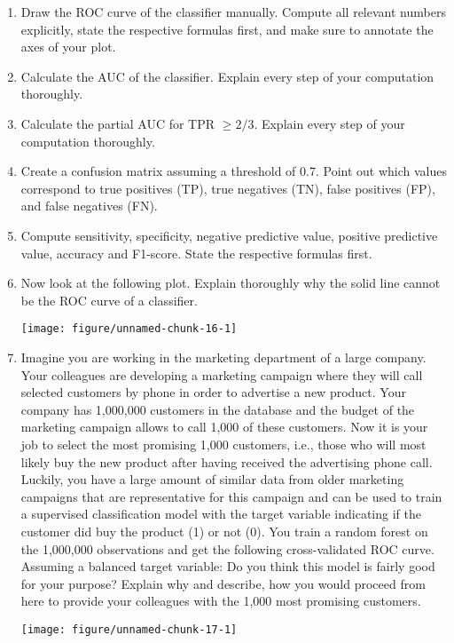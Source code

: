 \documentclass[a4paper]{article}
\makeatletter
\def\maxwidth{ %
  \ifdim\Gin@nat@width>\linewidth
    \linewidth
  \else
    \Gin@nat@width
  \fi
}
\makeatother
\begin{document}
{{\begin{enumerate}
  \item Draw the ROC curve of the classifier manually. Compute all relevant 
  numbers explicitly, state the respective formulas first, and make sure to 
  annotate the axes of your plot.
  \item Calculate the AUC of the classifier. Explain every step of your 
  computation thoroughly.
  \item Calculate the partial AUC for TPR $\geq 2/3$. Explain every step of your 
  computation thoroughly.
  \item Create a confusion matrix assuming a threshold of 0.7. Point out which 
  values correspond to true positives (TP), true negatives (TN), false positives 
  (FP), and false negatives (FN).
  \item Compute sensitivity, specificity, negative predictive value, positive 
  predictive value, accuracy and F1-score. State the respective formulas first.  
  \item Now look at the following plot. Explain thoroughly why the solid line 
  cannot be the ROC curve of a classifier.

\texttt{[image: figure/unnamed-chunk-16-1]} 

  \item Imagine you are working in the marketing department of a large company. 
  Your colleagues are developing a marketing campaign where they will call 
  selected customers by phone in order to advertise a new product. Your company 
  has 1,000,000 customers in the database and the budget of the marketing 
  campaign allows to call 1,000 of these customers. Now it is your job to select 
  the most promising 1,000 customers, i.e., those who will most likely buy the 
  new product after having received the advertising phone call. Luckily, you 
  have a large amount of similar data from older marketing campaigns that are 
  representative for this campaign and can be used to train a supervised 
  classification model with the target variable indicating if the customer did 
  buy the product (1) or not (0). You train a random forest on the 1,000,000 
  observations and get the following cross-validated ROC curve. Assuming a 
  balanced target variable: Do you think this model is fairly good for your 
  purpose? Explain why and describe, how you would proceed from here to provide 
  your colleagues with the 1,000 most promising customers.

\texttt{[image: figure/unnamed-chunk-17-1]} 


\end{enumerate}}}
\end{document}
